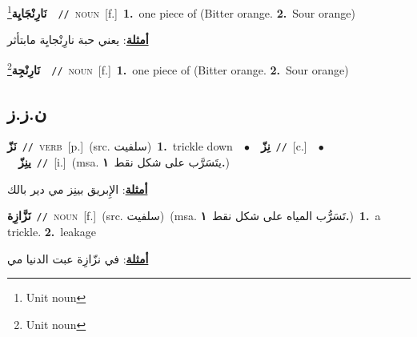 \documentclass[10pt,a4paper,twoside]{article} %
\begin{document}
\begin{multicols}{2}
{\setlength\topsep{0pt}\textbf{\foreignlanguage{arabic}{نَارِنْجَايِة}}\footnote{Unit noun}\ \ {\color{gray}\texttt{//}\color{black}}\ \textsc{noun}\ [f.]\ \textbf{1.}~one piece of (Bitter orange.  \textbf{2.}~Sour orange)\  \begin{flushright}\color{gray}\foreignlanguage{arabic}{\textbf{\underline{\foreignlanguage{arabic}{أمثلة}}}: يعني حبة نارِنْجايِة مابتأثر}\end{flushright}\color{black}} \vspace{2mm}

{\setlength\topsep{0pt}\textbf{\foreignlanguage{arabic}{نَارِنْجِة}}\footnote{Unit noun}\ \ {\color{gray}\texttt{//}\color{black}}\ \textsc{noun}\ [f.]\ \textbf{1.}~one piece of (Bitter orange.  \textbf{2.}~Sour orange)\ } \vspace{2mm}

\vspace{-3mm}
\subsection*{\color{blue}\foreignlanguage{arabic}{ن.ز.ز}\color{blue}{}} 

{\setlength\topsep{0pt}\textbf{\foreignlanguage{arabic}{نَزّ}}\ {\color{gray}\texttt{//}\color{black}}\ \textsc{verb}\ [p.]\ (src. \color{gray}\foreignlanguage{arabic}{سلفيت}\color{black})\ \textbf{1.}~trickle down\ \ $\bullet$\ \ \setlength\topsep{0pt}\textbf{\foreignlanguage{arabic}{نِزّ}}\ {\color{gray}\texttt{//}\color{black}}\ [c.]\ \ $\bullet$\ \ \setlength\topsep{0pt}\textbf{\foreignlanguage{arabic}{ينِزّ}}\ {\color{gray}\texttt{//}\color{black}}\ [i.]\ \color{gray}(msa. \foreignlanguage{arabic}{يتَسَرَّب على شكل نقط}~\foreignlanguage{arabic}{\textbf{١.}})\color{black}\  \begin{flushright}\color{gray}\foreignlanguage{arabic}{\textbf{\underline{\foreignlanguage{arabic}{أمثلة}}}: الإِبريق بينِز مي دير بالك}\end{flushright}\color{black}} \vspace{2mm}

{\setlength\topsep{0pt}\textbf{\foreignlanguage{arabic}{نَزَّازِة}}\ {\color{gray}\texttt{//}\color{black}}\ \textsc{noun}\ [f.]\ (src. \color{gray}\foreignlanguage{arabic}{سلفيت}\color{black})\ \color{gray}(msa. \foreignlanguage{arabic}{تَسَرُّب المياه على شكل نقط}~\foreignlanguage{arabic}{\textbf{١.}})\color{black}\ \textbf{1.}~a trickle.  \textbf{2.}~leakage\  \begin{flushright}\color{gray}\foreignlanguage{arabic}{\textbf{\underline{\foreignlanguage{arabic}{أمثلة}}}: في نزّازِة عبت الدنيا مي}\end{flushright}\color{black}} \vspace{2mm}


\end{multicols}
\end{document}
